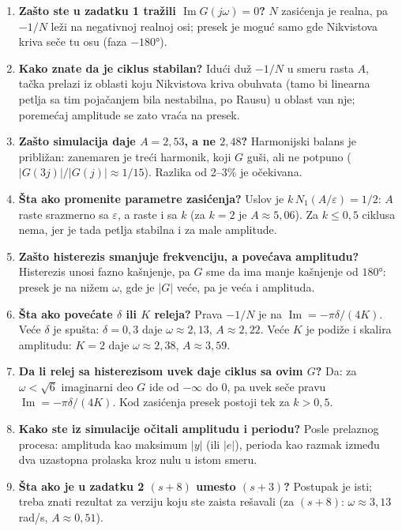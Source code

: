 \documentclass[11pt,a4paper,parskip=half,headsepline,numbers=noenddot]{scrartcl}
\begin{document}
\begin{enumerate}
\def\labelenumi{\arabic{enumi}.}
\item \textbf{Zašto ste u zadatku 1 tražili \(\operatorname{Im}G(j\omega) = 0\)?} \(N\) zasićenja je realna, pa \(-1/N\) leži na negativnoj realnoj osi; presek je moguć samo gde Nikvistova kriva seče tu osu (faza \(-180°\)).
\item \textbf{Kako znate da je ciklus stabilan?} Idući duž \(-1/N\) u smeru rasta \(A\), tačka prelazi iz oblasti koju Nikvistova kriva obuhvata (tamo bi linearna petlja sa tim pojačanjem bila nestabilna, po Rausu) u oblast van nje; poremećaj amplitude se zato vraća na presek.
\item \textbf{Zašto simulacija daje \(A = 2{,}53\), a ne \(2{,}48\)?} Harmonijski balans je približan: zanemaren je treći harmonik, koji \(G\) guši, ali ne potpuno (\(|G(3j)|/|G(j)| \approx 1/15\)). Razlika od 2--3\% je očekivana.
\item \textbf{Šta ako promenite parametre zasićenja?} Uslov je \(k\,N_1(A/\varepsilon) = 1/2\): \(A\) raste srazmerno sa \(\varepsilon\), a raste i sa \(k\) (za \(k = 2\) je \(A \approx 5{,}06\)). Za \(k \le 0{,}5\) ciklusa nema, jer je tada petlja stabilna i za male amplitude.
\item \textbf{Zašto histerezis smanjuje frekvenciju, a povećava amplitudu?} Histerezis unosi fazno kašnjenje, pa \(G\) sme da ima manje kašnjenje od \(180°\): presek je na nižem \(\omega\), gde je \(|G|\) veće, pa je veća i amplituda.
\item \textbf{Šta ako povećate \(\delta\) ili \(K\) releja?} Prava \(-1/N\) je na \(\operatorname{Im} = -\pi\delta/(4K)\). Veće \(\delta\) je spušta: \(\delta = 0{,}3\) daje \(\omega \approx 2{,}13\), \(A \approx 2{,}22\). Veće \(K\) je podiže i skalira amplitudu: \(K = 2\) daje \(\omega \approx 2{,}38\), \(A \approx 3{,}59\).
\item \textbf{Da li relej sa histerezisom uvek daje ciklus sa ovim \(G\)?} Da: za \(\omega < \sqrt6\) imaginarni deo \(G\) ide od \(-\infty\) do 0, pa uvek seče pravu \(\operatorname{Im} = -\pi\delta/(4K)\). Kod zasićenja presek postoji tek za \(k > 0{,}5\).
\item \textbf{Kako ste iz simulacije očitali amplitudu i periodu?} Posle prelaznog procesa: amplituda kao maksimum \(|y|\) (ili \(|e|\)), perioda kao razmak između dva uzastopna prolaska kroz nulu u istom smeru.
\item \textbf{Šta ako je u zadatku 2 \((s+8)\) umesto \((s+3)\)?} Postupak je isti; treba znati rezultat za verziju koju ste zaista rešavali (za \((s+8)\): \(\omega \approx 3{,}13\) rad/s, \(A \approx 0{,}51\)).
\end{enumerate}
\end{document}
